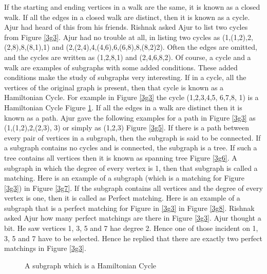 If the starting and ending vertices in a walk are the same, it is known as a closed walk. If all the edges in a closed walk are distinct, then it is known as a cycle. 
Ajur had heard of this from his friends.
Rishnak asked Ajur to list two cycles from Figure \ref{3g3}. Ajur had no trouble at all, in listing two cycles as (1,(1,2),2,(2,8),8,(8,1),1) and (2,(2,4),4,(4,6),6,(6,8),8,(8,2)2). Often the edges are omitted, and the cycles are written as (1,2,8,1) and (2,4,6,8,2).  Of course, a cycle and a walk are examples of subgraphs with some added conditions. These added conditions make the study of subgraphs very interesting. If in a cycle, all the vertices of the original graph is present, then that cycle is known as a Hamiltonian Cycle. For example in Figure \ref{3g3} the cycle (1,2,3,4,5, 6,7,8, 1) is a Hamiltonian Cycle Figure \ref{3g4}. If all the edges in a walk are distinct then it is known as a path. Ajur gave the following examples for a path in Figure \ref{3g3} as (1,(1,2),2,(2,3), 3) or simply as (1,2,3) Figure \ref{3g5}. If there is a path between every pair of vertices in a subgraph, then the subgraph is said to be connected. If a subgraph contains no cycles and is connected, the subgraph is a tree. If such a tree contains all vertices then it is known as spanning tree Figure \ref{3g6}.  A subgraph in which the degree of every vertex is 1, then that subgraph is called a matching. Here is an example of a subgraph (which is a matching for Figure \ref{3g3}) in Figure \ref{3g7}. If the subgraph contains all vertices and the degree of every vertex is one, then it is called as Perfect matching. Here is an example of a subgraph that is a perfect matching for Figure in \ref{3g3} in Figure \ref{3g8}. Rishnak asked Ajur how many perfect matchings are there in Figure \ref{3g3}. Ajur thought a bit. He saw vertices 1, 3, 5 and 7 hae degree 2. Hence one of those incident on 1, 3, 5 and 7 have to be selected. Hence he replied that there are exactly two perfect matchings in Figure \ref{3g3}. 
\\
\begin{figure}
\begin{center}
\caption{ A subgraph which is a Hamiltonian Cycle}\label{3g4}
\end{center}
\end{figure}

